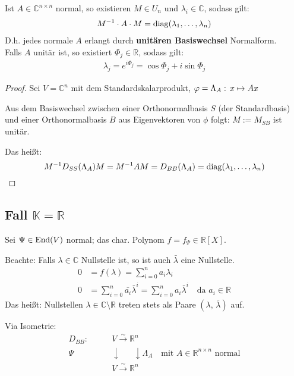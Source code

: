 \documentclass[parskip,a4paper,twoside,DIV15,BCOR12mm]{scrbook}
\begin{document}
\begin{corollary}
Ist $A\in\mathbb{C}^{n\times n}$ normal, so existieren $M\in U_n$ und $\lambda_i\in\mathbb{C}$,
sodass gilt:
\begin{align*}
M^{-1}\cdot A\cdot M = \operatorname{diag}(\lambda_1,\ldots,\lambda_n)
\end{align*}
D.h. jedes normale $A$ erlangt durch \textbf{unitären Basiswechsel} Normalform.\\
Falls $A$ unitär ist, so existiert $\Phi_j\in\mathbb{R}$, sodass gilt:
\begin{align*}
\lambda_j=e^{i\Phi_j}=\cos\Phi_j+i\sin\Phi_j
\end{align*}
\end{corollary}
\begin{proof}
Sei \(V=\mathbb{C}^{n}\) mit dem Standardskalarprodukt, 
\(\varphi=\Lambda_{A}:\,x\mapsto Ax\)

Aus dem Basiswechsel zwischen einer Orthonormalbasis \(S\) (der Standardbasis) 
und einer Orthonormalbasis \(B\) aus Eigenvektoren von \(\phi\) folgt:
\(M:=M_{SB}\) ist unitär.

Das hei\ss t:
\[
M^{-1}D_{SS}(\Lambda_{A})M=M^{-1}AM=D_{BB}(\Lambda_{A})=
    \operatorname{diag}(\lambda_{1},\ldots,\lambda_{n})
\]
\end{proof}

\subsection{Fall $\mathbb{K}=\mathbb{R}$} 

Sei \(\Psi\in\operatorname{End}(V)\) normal; das char. Polynom \(f=f_{\Psi}\in\mathbb{R}[X]\).

Beachte: Falls \(\lambda\in\mathbb{C}\) Nullstelle ist, so ist auch 
\(\bar{\lambda}\) eine Nullstelle.
\begin{align*}
0&=f(\lambda)=\sum_{i=0}^{n}{a_{i}\lambda_{i}}\\
0&=\sum_{i=0}^{n}{\bar{a_{i}}\bar{\lambda}^{i}}
    =\sum_{i=0}^{n}{a_{i}\bar{\lambda}^{i}}\quad\text{da }a_{i}\in\mathbb{R}
\end{align*}
Das hei\ss t: Nullstellen \(\lambda\in\mathbb{C}\setminus\mathbb{R}\) treten
stets als Paare \((\lambda,\,\bar{\lambda})\) auf.

Via Isometrie:
\begin{align*}
D_{BB}:\qquad
&V\overset{\sim}{\longrightarrow}\mathbb{R}^{n}\\
\Psi&\downarrow\phantom{\longrightarrow}\downarrow\Lambda_{A}\quad\text{mit }A\in\mathbb{R}^{n\times n}\text{ normal}\\
&V\overset{\sim}{\longrightarrow}\mathbb{R}^{n}
\end{align*}
\end{document}
